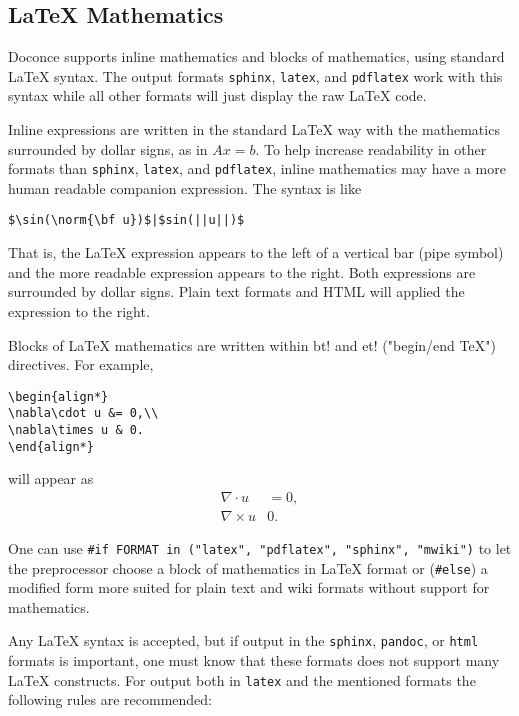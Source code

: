 \documentclass[twoside]{article}
\begin{document}
\noindent

\subsection{{\LaTeX} Mathematics}

Doconce supports inline mathematics and blocks of mathematics, using
standard {\LaTeX} syntax. The output formats {\fontsize{10pt}{10pt}\verb!sphinx!}, {\fontsize{10pt}{10pt}\verb!latex!}, and {\fontsize{10pt}{10pt}\verb!pdflatex!}
work with this syntax while all other formats will just display the
raw {\LaTeX} code.

Inline expressions are written in the standard
{\LaTeX} way with the mathematics surrounded by dollar signs, as in
$Ax=b$. To help increase readability in other formats than {\fontsize{10pt}{10pt}\verb!sphinx!},
{\fontsize{10pt}{10pt}\verb!latex!}, and {\fontsize{10pt}{10pt}\verb!pdflatex!}, inline mathematics may have a more human
readable companion expression. The syntax is like
\begin{Verbatim}
$\sin(\norm{\bf u})$|$sin(||u||)$
\end{Verbatim}
That is, the {\LaTeX} expression appears to the left of a vertical bar (pipe
symbol) and the more readable expression appears to the right. Both
expressions are surrounded by dollar signs. Plain text formats and HTML
will applied the expression to the right.

Blocks of {\LaTeX} mathematics are written within
{\fontsize{10pt}{10pt}\verb!!bt!}
and
{\fontsize{10pt}{10pt}\verb!!et!} ("begin/end TeX") directives.
For example,
\begin{Verbatim}
\begin{align*}
\nabla\cdot u &= 0,\\
\nabla\times u & 0.
\end{align*}
\end{Verbatim}
will appear as
\begin{align*}
\nabla\cdot u &= 0,\\
\nabla\times u & 0.
\end{align*}

One can use {\fontsize{10pt}{10pt}\verb!#if FORMAT in ("latex", "pdflatex", "sphinx", "mwiki")!} to let
the preprocessor choose a block of mathematics in {\LaTeX} format
or ({\fontsize{10pt}{10pt}\verb!#else!}) a modified form more suited for plain text and wiki
formats without support for mathematics.

Any {\LaTeX} syntax is accepted, but if output in the {\fontsize{10pt}{10pt}\verb!sphinx!}, {\fontsize{10pt}{10pt}\verb!pandoc!},
or {\fontsize{10pt}{10pt}\verb!html!} formats
is important, one must know that these formats does not support many
{\LaTeX} constructs. For output both in {\fontsize{10pt}{10pt}\verb!latex!} and the mentioned formats
the following rules are recommended:
\end{document}
